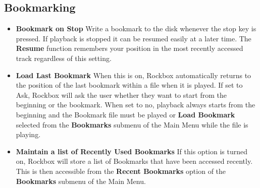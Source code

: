   \subsection{\label{ref:Bookmarkconfigactual}Bookmarking}
  
  \begin{itemize}
  \item \textbf{Bookmark on Stop}
    Write a bookmark to the disk whenever the stop key is pressed.  If playback is stopped it can be resumed easily at a later time. The \textbf{Resume} function remembers your position in the most recently accessed track regardless of this setting.
  \item \textbf{Load Last Bookmark}
    When this is on, Rockbox automatically returns to the position of the last bookmark within a file when it is played.  If set to Ask, Rockbox will ask the user whether they want to start from the beginning or the bookmark.  When set to no, playback always starts from the beginning and the Bookmark file must be played or \textbf{Load Bookmark} selected from the \textbf{Bookmarks} submenu of the Main Menu while the file is playing.
  \item \textbf{Maintain a list of Recently Used Bookmarks}
    If this option is turned on, Rockbox will store a list of Bookmarks that have been accessed recently.  This is then accessible from the \textbf{Recent Bookmarks} option of the \textbf{Bookmarks} submenu of the Main Menu.
  \end{itemize}